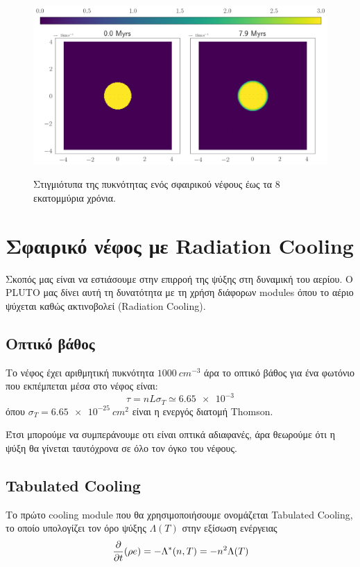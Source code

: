 	\begin{figure}[h]
		\centering
		\includegraphics[width=1.0\linewidth]{DataImages/NoCoolingRHOquad}
		\label{fig:NoCoolingRHOquad}
		\caption{Στιγμιότυπα της πυκνότητας ενός σφαιρικού νέφους έως τα 8 εκατομμύρια χρόνια.}
	\end{figure}	
	
	\section{Σφαιρικό νέφος με Radiation Cooling}
	Σκοπός μας είναι να εστιάσουμε στην επιρροή της ψύξης στη δυναμική του αερίου. Ο PLUTO μας δίνει αυτή τη δυνατότητα με τη χρήση διάφορων modules όπου το αέριο ψύχεται καθώς ακτινοβολεί (Radiation Cooling). 

	\subsection{Οπτικό βάθος}
	Το νέφος έχει αριθμητική πυκνότητα $\SI{1000}{cm^{-3}}$ άρα το οπτικό βάθος για ένα φωτόνιο που εκπέμπεται μέσα στο νέφος είναι:
	\begin{equation}
	\tau = nL\sigma _T\simeq \num{6.65e-3}
	\end{equation}
	όπου $\sigma _T = \SI{6.65e-25}{cm^2}$ είναι η ενεργός διατομή Thomson.
	
	Έτσι μπορούμε να συμπεράνουμε οτι είναι οπτικά αδιαφανές, άρα θεωρούμε ότι η ψύξη θα γίνεται ταυτόχρονα σε όλο τον όγκο του νέφους. 
	
	\subsection{Tabulated Cooling}
	Το πρώτο cooling module που θα χρησιμοποιήσουμε ονομάζεται Tabulated Cooling, το οποίο υπολογίζει τον όρο ψύξης $\Lambda (T )$ στην εξίσωση ενέργειας 
	\begin{equation}
		\pdv{t}(\rho e)=-\Lambda^*(n,T)=-n^2 \Lambda(T)
	\end{equation}
	
